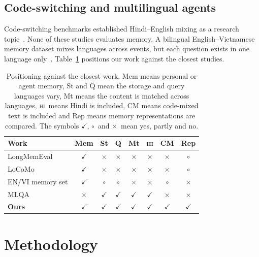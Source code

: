 \documentclass[11pt]{article}
\newcommand{\yes}{$\checkmark$}
\newcommand{\no}{$\times$}
\newcommand{\partly}{$\circ$}
\newcommand{\HI}{\textsc{hi}}
\begin{document}
\subsection{Code-switching and multilingual agents}
Code-switching benchmarks established Hindi--English mixing as a research topic~\citep{khanuja2020gluecos}.
None of these studies evaluates memory.
A bilingual English--Vietnamese memory dataset mixes languages across events, but each question exists in one language only~\citep{nguyendang2026lhmemory}.
Table~\ref{tab:related} positions our work against the closest studies.

\begin{table}[t]
\centering\small\setlength{\tabcolsep}{3pt}
\begin{tabular}{lccccccc}
\toprule
Work & Mem & St & Q & Mt & \HI & CM & Rep \\
\midrule
LongMemEval & \yes & \no & \no & \no & \no & \no & \partly \\
LoCoMo & \yes & \no & \no & \no & \no & \no & \partly \\
EN/VI memory set & \yes & \partly & \partly & \no & \no & \partly & \no \\
MLQA & \no & \yes & \yes & \yes & \yes & \no & \no \\
\textbf{Ours} & \yes & \yes & \yes & \yes & \yes & \yes & \yes \\
\bottomrule
\end{tabular}
\caption{Positioning against the closest work. Mem means personal or agent memory, St and Q mean the storage and query languages vary, Mt means the content is matched across languages, \HI\ means Hindi is included, CM means code-mixed text is included and Rep means memory representations are compared. The symbols \yes, \partly\ and \no\ mean yes, partly and no.}
\label{tab:related}
\end{table}

\section{Methodology}
\label{sec:method}
\end{document}
